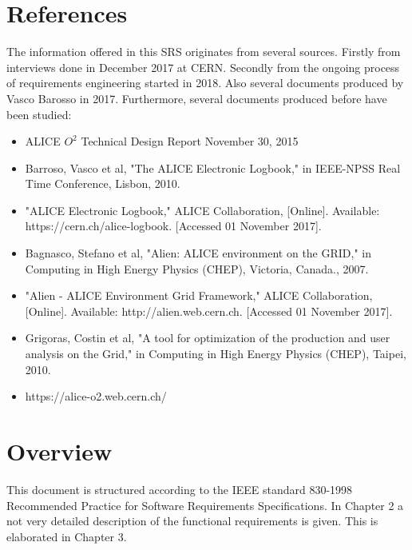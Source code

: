 \section{References}
The information offered in this SRS originates from several sources. Firstly from interviews done in December 2017 at CERN. Secondly from the ongoing process of requirements engineering started in 2018. Also several documents produced by Vasco Barosso in 2017. Furthermore, several documents produced before have been studied:
\begin{itemize}
  \item ALICE $O^2$ Technical Design Report November 30, 2015
  \item Barroso, Vasco et al, "The ALICE Electronic Logbook," in IEEE-NPSS Real Time Conference, Lisbon, 2010.
  \item "ALICE Electronic Logbook," ALICE Collaboration, [Online]. Available: https://cern.ch/alice-logbook. [Accessed 01 November 2017].
  \item Bagnasco, Stefano et al, "Alien: ALICE environment on the GRID," in Computing in High Energy Physics (CHEP), Victoria, Canada., 2007.
  \item "Alien - ALICE Environment Grid Framework," ALICE Collaboration, [Online]. Available: http://alien.web.cern.ch. [Accessed 01 November 2017].
  \item Grigoras, Costin et al, "A tool for optimization of the production and user analysis on the Grid," in Computing in High Energy Physics (CHEP), Taipei, 2010. 
  \item https://alice-o2.web.cern.ch/
\end{itemize}


\section{Overview}
This document is structured according to the IEEE standard 830-1998 Recommended Practice for Software Requirements Specifications. In Chapter 2 a not very detailed description of the functional requirements is given. This is elaborated in Chapter 3.
